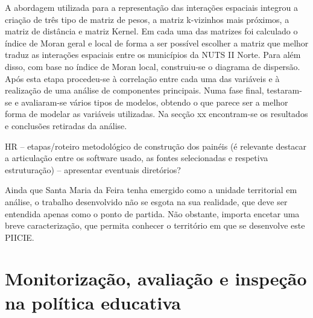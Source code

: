 \documentclass[
]{book}
\theoremstyle{definition}
\theoremstyle{definition}
\theoremstyle{definition}
\theoremstyle{definition}
\theoremstyle{remark}
\begin{document}
A abordagem utilizada para a representação das interações espaciais integrou a criação de três tipo de matriz de pesos, a matriz k-vizinhos mais próximos, a matriz de distância e matriz Kernel. Em cada uma das matrizes foi calculado o índice de Moran geral e local de forma a ser possível escolher a matriz que melhor traduz as interações espaciais entre os municípios da NUTS II Norte. Para além disso, com base no índice de Moran local, construiu-se o diagrama de dispersão.\\
Após esta etapa procedeu-se à correlação entre cada uma das variáveis e à realização de uma análise de componentes principais. Numa fase final, testaram-se e avaliaram-se vários tipos de modelos, obtendo o que parece ser a melhor forma de modelar as variáveis utilizadas. Na secção xx encontram-se os resultados e conclusões retiradas da análise.

HR -- etapas/roteiro metodológico de construção dos painéis (é relevante destacar a articulação entre os software usado, as fontes selecionadas e respetiva estruturação) -- apresentar eventuais diretórios?

Ainda que Santa Maria da Feira tenha emergido como a unidade territorial em análise, o trabalho desenvolvido não se esgota na sua realidade, que deve ser entendida apenas como o ponto de partida. Não obstante, importa encetar uma breve caracterização, que permita conhecer o território em que se desenvolve este PIICIE.

\hypertarget{monitorizauxe7uxe3o-avaliauxe7uxe3o-e-inspeuxe7uxe3o-na-poluxedtica-educativa}{%
\section{Monitorização, avaliação e inspeção na política educativa}\label{monitorizauxe7uxe3o-avaliauxe7uxe3o-e-inspeuxe7uxe3o-na-poluxedtica-educativa}}
\end{document}
